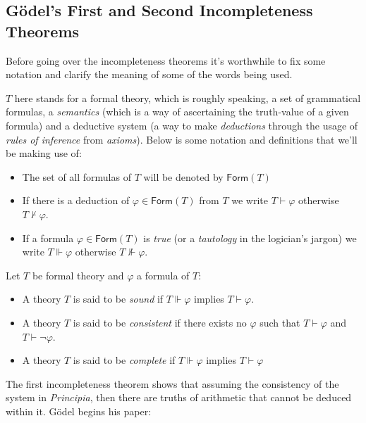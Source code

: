\documentclass[12p]{article}
\theoremstyle{definition}
\begin{document}
\subsection{Gödel's First and Second Incompleteness Theorems}
Before going over the incompleteness theorems it's worthwhile to fix some notation and clarify the meaning of some of the words being used.


$T$ here stands for a formal theory, which is roughly speaking, a set of grammatical formulas, a \textit{semantics} (which is a way of ascertaining the truth-value of a given formula) and a deductive system (a way to make \textit{deductions} through the usage of \textit{rules of inference} from \textit{axioms}). Below is some notation and definitions that we'll be making use of:
\begin{tcolorbox}[colback=white, arc=0.1pt]
	
	\begin{itemize}
		\item The set of all formulas of $T$ will be denoted by $\textsf{Form}(T) $ 
		\item If there is a deduction of $\varphi \in \textsf{Form}(T)$ from $T$ we write $T \vdash \varphi$ otherwise $T \nvdash \varphi$.
		\item If a formula $\varphi \in \textsf{Form}(T)$ is \textit{true} (or a \textit{tautology} in the logician's jargon) we write $T \Vdash \varphi$ otherwise $T \nVdash \varphi$.
	\end{itemize}
	Let $T$ be formal theory and $\varphi$ a formula of $T$:
	\begin{itemize}
		\item A theory $T$ is said to be \textit{sound} if $T \Vdash \varphi$ implies $T \vdash \varphi$.
		\item A theory $T$ is said to be \textit{consistent} if there exists no $\varphi$ such that $T \vdash \varphi$ and $T \vdash \neg \varphi$.
		\item A theory $T$ is said to be \textit{complete} if $T \Vdash \varphi$ implies $T \vdash \varphi$
	\end{itemize}
\end{tcolorbox}
The first incompleteness theorem shows that assuming the consistency of the system in \textit{Principia}, then there are truths of arithmetic that cannot be deduced within it. Gödel begins his paper:
\end{document}

